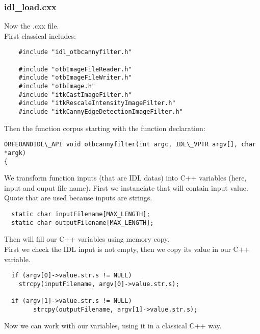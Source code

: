 \subsubsection{idl\_load.cxx}
Now the .cxx file.\\
First classical includes:
\begin{verbatim}
    #include "idl_otbcannyfilter.h"

    #include "otbImageFileReader.h"
    #include "otbImageFileWriter.h"
    #include "otbImage.h"
    #include "itkCastImageFilter.h"
    #include "itkRescaleIntensityImageFilter.h"
    #include "itkCannyEdgeDetectionImageFilter.h"
\end{verbatim}
Then the function corpus starting with the function declaration:
\begin{verbatim}
ORFEOANDIDL\_API void otbcannyfilter(int argc, IDL\_VPTR argv[], char *argk)
{
\end{verbatim}
We transform function inputs (that are IDL datas) into C++ variables (here, input and ouput file name).
First we instanciate  that will contain input value. Quote that  are used because inputs are strings.
\begin{verbatim}
  static char inputFilename[MAX_LENGTH];
  static char outputFilename[MAX_LENGTH];
\end{verbatim} 
Then will fill our C++ variables using memory copy.\\
First we check the IDL input is not empty, then we copy its value in our C++ variable.
\begin{verbatim}
  if (argv[0]->value.str.s != NULL)
    strcpy(inputFilename, argv[0]->value.str.s);
  
  if (argv[1]->value.str.s != NULL)
		strcpy(outputFilename, argv[1]->value.str.s);
\end{verbatim}
Now we can work with our variables, using it in a classical C++ way.
